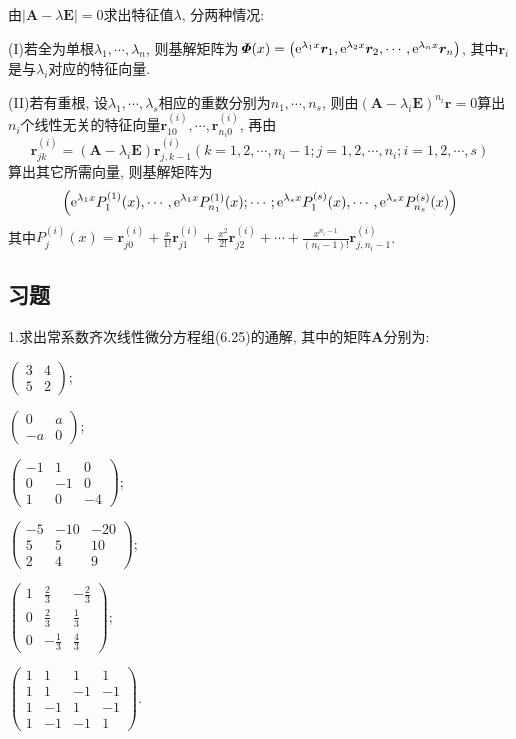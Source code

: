 由$|\bm{A}-\lambda\bm{E}|=0$求出特征值$\lambda$, 分两种情况:

(I)若全为单根$\lambda_1,\cdots,\lambda_n$, 
则基解矩阵为$\bm{\mathit{\Phi}}(x)=\left(\mathrm{e}^{\lambda_1x}\bm{r}_1,\mathrm{e}^{\lambda_2x}\bm{r}_2,\cdots,\mathrm{e}^{\lambda_nx}\bm{r}_n\right)$, 
其中$\bm{r}_i$是与$\lambda_i$对应的特征向量.

(II)若有重根, 设$\lambda_1,\cdots,\lambda_s$相应的重数分别为$n_1,\cdots,n_s$, 
则由$(\bm{A}-\lambda_i\bm{E})^{n_i}\bm{r}=0$算出$n_i$个线性无关的特征向量$\bm{r}_{10}^{(i)},\cdots,\bm{r}_{n_i0}^{(i)}$, 再由
\[\bm{r}_{jk}^{(i)}=(\bm{A}-\lambda_i\bm{E})\bm{r}_{j,k-1}^{(i)}(k=1,2,\cdots,n_i-1;j=1,2,\cdots,n_i;i=1,2,\cdots,s)\]
算出其它所需向量, 则基解矩阵为
\[\left(\mathrm{e}^{\lambda_1x}P_1^{(1)}(x),\cdots,\mathrm{e}^{\lambda_1x}P_{n_1}^{(1)}(x);\cdots;\mathrm{e}^{\lambda_sx}P_1^{(s)}(x),\cdots,\mathrm{e}^{\lambda_sx}P_{n_s}^{(s)}(x)\right)\]
其中$\displaystyle P_j^{(i)}(x)=\bm{r}_{j0}^{(i)}+\frac{x}{1!}\bm{r}_{j1}^{(i)}+\frac{x^2}{2!}\bm{r}_{j2}^{(i)}+\cdots+\frac{x^{n_i-1}}{(n_i-1)!}\bm{r}_{j,n_i-1}^{(i)}$.


\subsection{习题}


1.求出常系数齐次线性微分方程组(6.25)的通解, 其中的矩阵$\bm{A}$分别为:
\begin{exer}
\item $\displaystyle\begin{pmatrix}3&4\\5&2\end{pmatrix}$;
\item $\displaystyle\begin{pmatrix}0&a\\-a&0\end{pmatrix}$;
\item $\displaystyle\begin{pmatrix}-1&1&0\\0&-1&0\\1&0&-4\end{pmatrix}$;
\item $\displaystyle\begin{pmatrix}-5&-10&-20\\5&5&10\\2&4&9\end{pmatrix}$;\\
\item $\displaystyle\begin{pmatrix}1&\frac{2}{3}&-\frac{2}{3}\\0&\frac{2}{3}&\frac{1}{3}\\0&-\frac{1}{3}&\frac{4}{3}\end{pmatrix}$;
\item $\displaystyle\begin{pmatrix}1&1&1&1\\1&1&-1&-1\\1&-1&1&-1\\1&-1&-1&1\end{pmatrix}$.
\end{exer}

